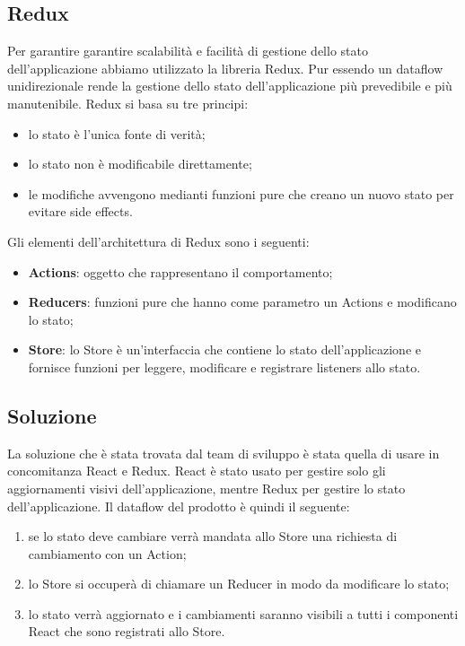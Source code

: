 \subsection{Redux}
Per garantire garantire scalabilità e facilità di gestione dello stato dell'applicazione abbiamo utilizzato la libreria Redux. Pur essendo un dataflow unidirezionale rende la gestione dello stato dell'applicazione più prevedibile e più manutenibile. Redux si basa su tre principi:
\begin{itemize}
	\item lo stato è l'unica fonte di verità;
	\item lo stato non è modificabile direttamente;
	\item le modifiche avvengono medianti funzioni pure che creano un nuovo stato per evitare side effects.
\end{itemize}
\noindent
Gli elementi dell'architettura di Redux sono i seguenti:
\begin{itemize}
	\item \textbf{Actions}: oggetto che rappresentano il comportamento;
	\item \textbf{Reducers}: funzioni pure che hanno come parametro un Actions e modificano lo stato;
	\item \textbf{Store}: lo Store è un'interfaccia che contiene lo stato dell'applicazione e fornisce funzioni per leggere, modificare e registrare listeners allo stato.
\end{itemize}
\noindent

\subsection{Soluzione}
La soluzione che è stata trovata dal team di sviluppo è stata quella di usare in concomitanza React e Redux. React è stato usato per gestire solo gli aggiornamenti visivi dell'applicazione, mentre Redux per gestire lo stato dell'applicazione. Il dataflow del prodotto è quindi il seguente:
\begin{enumerate}
	\item se lo stato deve cambiare verrà mandata allo Store una richiesta di cambiamento con un Action;
	\item lo Store si occuperà di chiamare un Reducer in modo da modificare lo stato;
	\item lo stato verrà aggiornato e i cambiamenti saranno visibili a tutti i componenti React che sono registrati allo Store.
\end{enumerate}

